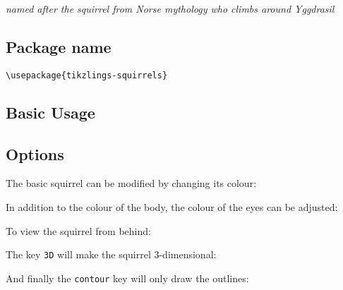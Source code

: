 \documentclass[parskip=half]{scrartcl}
\begin{document}
\emph{named after the squirrel from Norse mythology who climbs around Yggdrasil}

\subsection{Package name}

\begin{tcolorbox}[lower separated=false, lefthand width=.8\linewidth]
\vspace*{0.5cm}
\lstinline|\usepackage{tikzlings-squirrels}| 
\vspace*{0.5cm}
\end{tcolorbox}

\subsection{Basic Usage}

\begin{tcblisting}{}
\squirrel
\end{tcblisting}

\subsection{Options}

The basic squirrel can be modified by changing its colour:
\begin{tcblisting}{}
\squirrel[body=blue]
\end{tcblisting}

In addition to the colour of the body, the colour of the eyes can be adjusted:
\begin{tcblisting}{}
\squirrel[eye=red]
\end{tcblisting}
\begin{tcblisting}{}
\squirrel[pupil=red]
\end{tcblisting}

To view the squirrel from behind:
\begin{tcblisting}{}
\squirrel[back]
\end{tcblisting}

The key \lstinline|3D| will make the squirrel 3-dimensional:
\begin{tcblisting}{}
\squirrel[3D]
\end{tcblisting}

And finally the \lstinline|contour| key will only draw the outlines:
\begin{tcblisting}{}
\squirrel[contour=black]
\end{tcblisting}
\end{document}

